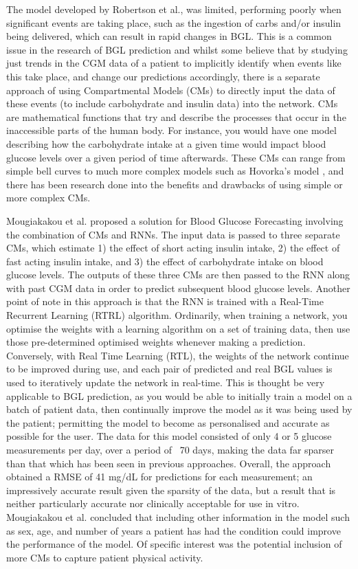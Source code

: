       The model developed by Robertson et al., was limited, performing poorly when significant events are taking place, such as the ingestion of carbs and/or insulin being delivered, which can result in rapid changes in BGL. This is a common issue in the research of BGL prediction and whilst some believe that by studying just trends in the CGM data of a patient to implicitly identify when events like this take place, and change our predictions accordingly, there is a separate approach of using Compartmental Models (CMs) \cite{CMS} to directly input the data of these events (to include carbohydrate and insulin data) into the network. CMs are mathematical functions that try and describe the processes that occur in the inaccessible parts of the human body. For instance, you would have one model describing how the carbohydrate intake at a given time would impact blood glucose levels over a given period of time afterwards. These CMs can range from simple bell curves to much more complex models such as Hovorka's model \cite{hovorka}, and there has been research done into the benefits and drawbacks of using simple or more complex CMs. 

      Mougiakakou et al. \cite{paper4} proposed a solution for Blood Glucose Forecasting involving the combination of CMs and RNNs. The input data is passed to three separate CMs, which estimate 1) the effect of short acting insulin intake, 2) the effect of fast acting insulin intake, and 3) the effect of carbohydrate intake on blood glucose levels. The outputs of these three CMs are then passed to the RNN along with past CGM data in order to predict subsequent blood glucose levels. Another point of note in this approach is that the RNN is trained with a Real-Time Recurrent Learning (RTRL) algorithm. Ordinarily, when training a network, you optimise the weights with a learning algorithm on a set of training data, then use those pre-determined optimised weights whenever making a prediction. Conversely, with Real Time Learning (RTL), the weights of the network continue to be improved during use, and each pair of predicted and real BGL values is used to iteratively update the network in real-time. This is thought be very applicable to BGL prediction, as you would be able to initially train a model on a batch of patient data, then continually improve the model as it was being used by the patient; permitting the model to become as personalised and accurate as possible for the user. The data for this model consisted of only 4 or 5 glucose measurements per day, over a period of ~70 days, making the data far sparser than that which has been seen in previous approaches. Overall, the approach obtained a RMSE of 41 mg/dL for predictions for each measurement; an impressively accurate result given the sparsity of the data, but a result that is neither particularly accurate nor clinically acceptable for use in vitro. Mougiakakou et al. \cite{paper4} concluded that including other information in the model such as sex, age, and number of years a patient has had the condition could improve the performance of the model. Of specific interest was the potential inclusion of more CMs to capture patient physical activity.

